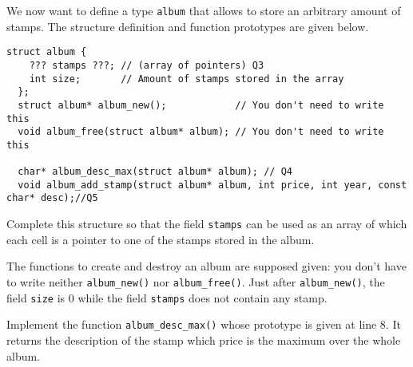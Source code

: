 \documentclass[10pt]{article}\usepackage[enonce]{exemptty}
\begin{document}
We now want to define a type \texttt{album} that allows to store an arbitrary
amount of stamps. The structure definition and function prototypes are given
below.

\begin{Verbatim}[gobble=2]
  struct album {
    ??? stamps ???; // (array of pointers) Q3
    int size;       // Amount of stamps stored in the array
  };
  struct album* album_new();            // You don't need to write this
  void album_free(struct album* album); // You don't need to write this

  char* album_desc_max(struct album* album); // Q4
  void album_add_stamp(struct album* album, int price, int year, const char* desc);//Q5
\end{Verbatim}

\vspace{-.5\baselineskip}%
\Question Complete this structure so that the field \texttt{stamps} can be used
as an array of which each cell is a pointer to one of the stamps stored in the
album.

The functions to create and destroy an album are supposed given: you don't have
to write neither \texttt{album\_new()} nor \texttt{album\_free()}. Just after
\texttt{album\_new()}, the field \texttt{size} is 0 while the field
\texttt{stamps} does not contain any stamp.

\Question Implement the function \texttt{album\_desc\_max()} whose prototype is
given at line 8. It returns the description of the stamp which price is the
maximum over the whole album.
\end{document}
